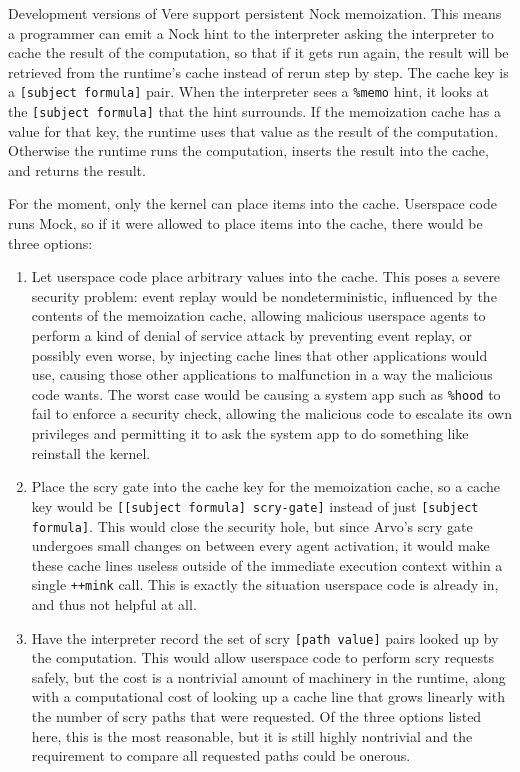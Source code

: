 \documentclass[twoside]{article}
\begin{document}
Development versions of Vere support persistent Nock memoization.  This means a programmer can emit a Nock hint to the interpreter asking the interpreter to cache the result of the computation, so that if it gets run again, the result will be retrieved from the runtime's cache instead of rerun step by step.  The cache key is a \lstinline[style=inlinecode]{[subject formula]} pair.  When the interpreter sees a \lstinline[style=inlinecode]{%memo} hint, it looks at the \lstinline[style=inlinecode]{[subject formula]} that the hint surrounds. If the memoization cache has a value for that key, the runtime uses that value as the result of the computation.  Otherwise the runtime runs the computation, inserts the result into the cache, and returns the result.

For the moment, only the kernel can place items into the cache.  Userspace code runs Mock, so if it were allowed to place items into the cache, there would be three options:

\begin{enumerate}
  \item  Let userspace code place arbitrary values into the cache.  This poses a severe security problem:  event replay would be nondeterministic, influenced by the contents of the memoization cache, allowing malicious userspace agents to perform a kind of denial of service attack by preventing event replay, or possibly even worse, by injecting cache lines that other applications would use, causing those other applications to malfunction in a way the malicious code wants.  The worst case would be causing a system app such as \lstinline[style=inlinecode]{%hood} to fail to enforce a security check, allowing the malicious code to escalate its own privileges and permitting it to ask the system app to do something like reinstall the kernel.

  \item  Place the scry gate into the cache key for the memoization cache, so a cache key would be \lstinline[style=inlinecode]{[[subject formula] scry-gate]} instead of just \lstinline[style=inlinecode]{[subject formula]}.  This would close the security hole, but since Arvo's scry gate undergoes small changes on between every agent activation, it would make these cache lines useless outside of the immediate execution context within a single \lstinline[style=inlinecode]{++mink} call.  This is exactly the situation userspace code is already in, and thus not helpful at all.

  \item  Have the interpreter record the set of scry \lstinline[style=inlinecode]{[path value]} pairs looked up by the computation.  This would allow userspace code to perform scry requests safely, but the cost is a nontrivial amount of machinery in the runtime, along with a computational cost of looking up a cache line that grows linearly with the number of scry paths that were requested.  Of the three options listed here, this is the most reasonable, but it is still highly nontrivial and the requirement to compare all requested paths could be onerous.
\end{enumerate}
\end{document}
